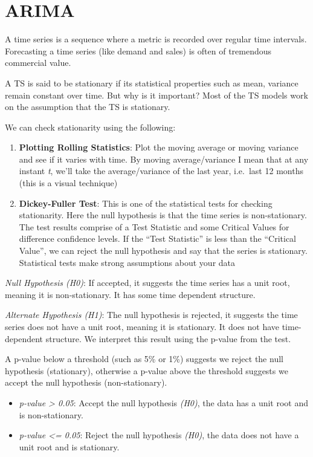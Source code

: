 \documentclass[11pt]{article}
\begin{document}
    \hypertarget{arima}{%
\section{ARIMA}\label{arima}}

    A time series is a sequence where a metric is recorded over regular time
intervals. Forecasting a time series (like demand and sales) is often of
tremendous commercial value.

    A TS is said to be stationary if its statistical properties such as
mean, variance remain constant over time. But why is it important? Most
of the TS models work on the assumption that the TS is stationary.

    We can check stationarity using the following:

\begin{enumerate}
\def\labelenumi{\arabic{enumi}.}
\item
  \textbf{Plotting Rolling Statistics}: Plot the moving average or
  moving variance and see if it varies with time. By moving
  average/variance I mean that at any instant \emph{t}, we'll take the
  average/variance of the last year, i.e.~last 12 months (this is a
  visual technique)
\item
  \textbf{Dickey-Fuller Test}: This is one of the statistical tests for
  checking stationarity. Here the null hypothesis is that the time
  series is non-stationary. The test results comprise of a Test
  Statistic and some Critical Values for difference confidence levels.
  If the ``Test Statistic'' is less than the ``Critical Value'', we can
  reject the null hypothesis and say that the series is stationary.
  Statistical tests make strong assumptions about your data
\end{enumerate}

    \emph{Null Hypothesis (H0)}: If accepted, it suggests the time series
has a unit root, meaning it is non-stationary. It has some time
dependent structure.

    \emph{Alternate Hypothesis (H1)}: The null hypothesis is rejected, it
suggests the time series does not have a unit root, meaning it is
stationary. It does not have time-dependent structure. We interpret this
result using the p-value from the test.

    A p-value below a threshold (such as 5\% or 1\%) suggests we reject the
null hypothesis (stationary), otherwise a p-value above the threshold
suggests we accept the null hypothesis (non-stationary).

\begin{itemize}
\item
  \emph{p-value \textgreater{} 0.05}: Accept the null hypothesis
  \emph{(H0)}, the data has a unit root and is non-stationary.
\item
  \emph{p-value \textless= 0.05}: Reject the null hypothesis
  \emph{(H0)}, the data does not have a unit root and is stationary.
\end{itemize}
\end{document}
